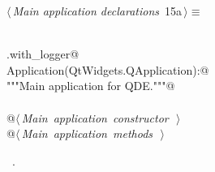 \documentclass[
    a4paper,      %
    10pt,         %
    openright,    %
    notitlepage,  %
    parskip=half, %
]{scrreprt}       %
\theoremstyle{definition}                    %
\begin{document}
\begin{flushleft} \small
\begin{minipage}{\linewidth}\label{scrap2}\raggedright\small
{} $\langle\,${\itshape Main application declarations}\nobreak\ {\footnotesize {15a}}$\,\rangle\equiv$
\vspace{-1ex}
\begin{list}{}{} \item
\mbox{}\lstinline@@\\
\mbox{}\lstinline@common.with_logger@\\
\mbox{}\lstinline@class Application(QtWidgets.QApplication):@\\
\mbox{}\lstinline@    """Main application for QDE."""@\\
\mbox{}\lstinline@@\\
\mbox{}\lstinline@    @\hbox{$\langle\,${\itshape Main application constructor}\nobreak\ {\footnotesize {}}$\,\rangle$}\lstinline@@\\
\mbox{}\lstinline@    @\hbox{$\langle\,${\itshape Main application methods}\nobreak\ {\footnotesize {}}$\,\rangle$}\lstinline@@\\
\mbox{}\lstinline@@{\NWsep}
\end{list}
\vspace{-1.5ex}
\footnotesize
\begin{list}{}{\setlength{\itemsep}{-\parsep}\setlength{\itemindent}{-\leftmargin}}
\item \NWtxtMacroRefIn\ .

\item{}
\end{list}
\end{minipage}\vspace{4ex}
\end{flushleft}
\end{document}
